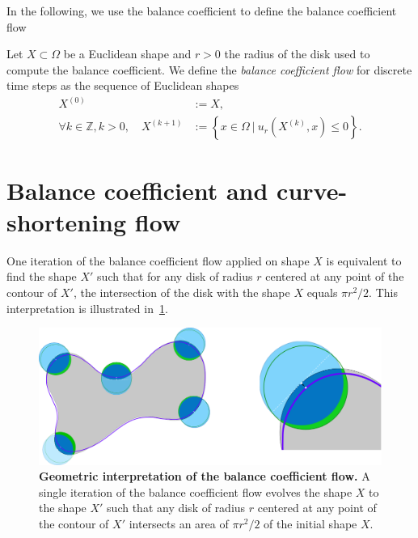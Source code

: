 \documentclass{siamart220329}
\newcommand{\Z}{\mathbb{Z}}
\begin{document}
In the following, we use the balance coefficient to define the balance
coefficient flow 

\begin{definition}
Let $X \subset \Omega$ be a Euclidean shape and $r>0$ the radius of the disk
used to compute the balance coefficient. We define the \emph{balance
coefficient flow} for discrete time steps as the sequence of Euclidean
shapes
%
%
\begin{align}
  X^{(0)} & := X, \nonumber \\
  \forall k \in \Z, k > 0, \quad X^{(k+1)} & := \left\{ x \in \Omega \: | \: u_r(X^{(k)}, x) \leq 0 \right\}. \label{eq-balance-coefficient-flow}
\end{align}
%
%
\end{definition}
%
%
\section{Balance coefficient and curve-shortening flow}\label{sec:balance-coefficient-and-csf}
%
%
One iteration of the balance coefficient flow applied on shape $X$ is
equivalent to find the shape $X'$ such that for any disk of radius $r$ centered
at any point of the contour of $X'$, the intersection of the disk with the
shape $X$ equals $\pi r^2/2$. This interpretation is illustrated
in~\cref{fig:geometric-interpretation}.
%
% 
\begin{figure}
\center
\includegraphics[scale=0.25]{figures/zero-level-set/geometric-interpretation.png}
\caption{\textbf{Geometric interpretation of the balance coefficient flow.} A
single iteration of the balance coefficient flow evolves the shape $X$ to
the shape $X'$ such that any disk of radius $r$ centered at any point of the
contour of $X'$ intersects  an area of $\pi r^2/2$ of the initial shape
$X$.}
\label{fig:geometric-interpretation}
\end{figure}
% 
%
\end{document}
